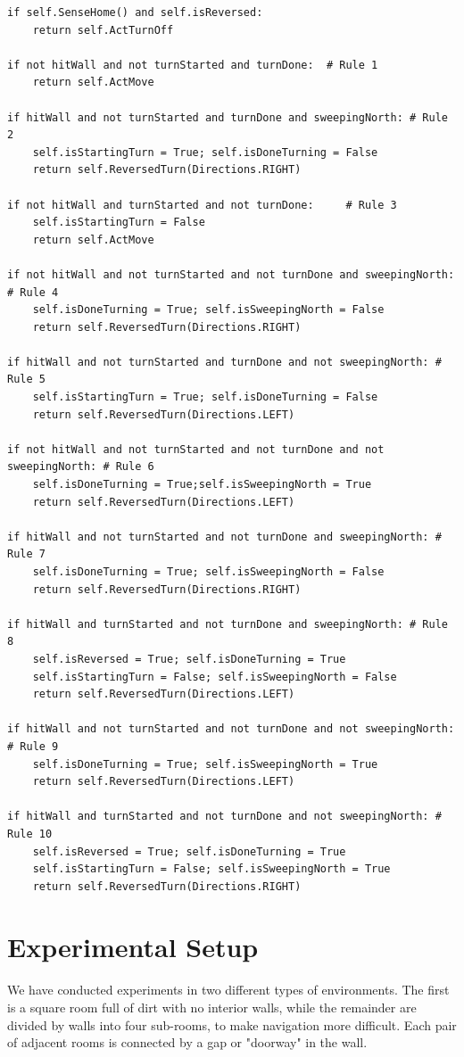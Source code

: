 \documentclass{article}
\begin{document}
\begin{lstlisting}[frame=single]
if self.SenseHome() and self.isReversed:
	return self.ActTurnOff

if not hitWall and not turnStarted and turnDone:  # Rule 1
	return self.ActMove

if hitWall and not turnStarted and turnDone and sweepingNorth: # Rule 2
	self.isStartingTurn = True; self.isDoneTurning = False
	return self.ReversedTurn(Directions.RIGHT)

if not hitWall and turnStarted and not turnDone:	 # Rule 3
	self.isStartingTurn = False
	return self.ActMove

if not hitWall and not turnStarted and not turnDone and sweepingNorth: # Rule 4
	self.isDoneTurning = True; self.isSweepingNorth = False
	return self.ReversedTurn(Directions.RIGHT)

if hitWall and not turnStarted and turnDone and not sweepingNorth: # Rule 5
	self.isStartingTurn = True; self.isDoneTurning = False
	return self.ReversedTurn(Directions.LEFT)

if not hitWall and not turnStarted and not turnDone and not sweepingNorth: # Rule 6
	self.isDoneTurning = True;self.isSweepingNorth = True
	return self.ReversedTurn(Directions.LEFT)

if hitWall and not turnStarted and not turnDone and sweepingNorth: # Rule 7
	self.isDoneTurning = True; self.isSweepingNorth = False
	return self.ReversedTurn(Directions.RIGHT) 

if hitWall and turnStarted and not turnDone and sweepingNorth: # Rule 8
	self.isReversed = True; self.isDoneTurning = True
	self.isStartingTurn = False; self.isSweepingNorth = False
	return self.ReversedTurn(Directions.LEFT) 

if hitWall and not turnStarted and not turnDone and not sweepingNorth: # Rule 9
	self.isDoneTurning = True; self.isSweepingNorth = True
	return self.ReversedTurn(Directions.LEFT) 

if hitWall and turnStarted and not turnDone and not sweepingNorth: # Rule 10
	self.isReversed = True; self.isDoneTurning = True
	self.isStartingTurn = False; self.isSweepingNorth = True
	return self.ReversedTurn(Directions.RIGHT) 
\end{lstlisting}



\section{Experimental Setup}
We have conducted experiments in two different types of environments.
The first is a square room full of dirt with no interior walls, while the remainder are divided by walls into four sub-rooms, to make navigation more difficult. Each pair of adjacent rooms is connected by a gap or "doorway" in the wall.
\end{document}
